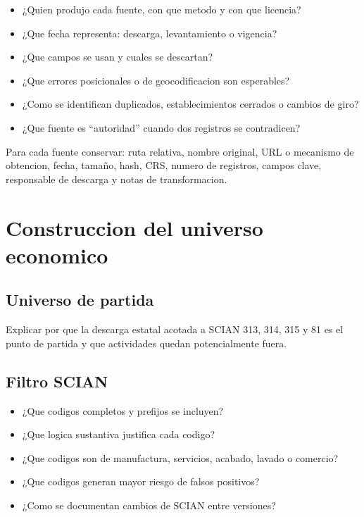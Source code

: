 \documentclass[11pt,letterpaper]{article}
\begin{document}
\begin{preguntas}
\begin{itemize}
    \item ¿Quien produjo cada fuente, con que metodo y con que licencia?
    \item ¿Que fecha representa: descarga, levantamiento o vigencia?
    \item ¿Que campos se usan y cuales se descartan?
    \item ¿Que errores posicionales o de geocodificacion son esperables?
    \item ¿Como se identifican duplicados, establecimientos cerrados o cambios de giro?
    \item ¿Que fuente es ``autoridad'' cuando dos registros se contradicen?
\end{itemize}
\end{preguntas}

\begin{trazabilidad}
Para cada fuente conservar: ruta relativa, nombre original, URL o mecanismo de obtencion, fecha, tamaño, hash, CRS, numero de registros, campos clave, responsable de descarga y notas de transformacion.
\end{trazabilidad}

\section{Construccion del universo economico}

\subsection{Universo de partida}
Explicar por que la descarga estatal acotada a SCIAN 313, 314, 315 y 81 es el punto de partida y que actividades quedan potencialmente fuera.

\subsection{Filtro SCIAN}
\begin{preguntas}
\begin{itemize}
    \item ¿Que codigos completos y prefijos se incluyen?
    \item ¿Que logica sustantiva justifica cada codigo?
    \item ¿Que codigos son de manufactura, servicios, acabado, lavado o comercio?
    \item ¿Que codigos generan mayor riesgo de falsos positivos?
    \item ¿Como se documentan cambios de SCIAN entre versiones?
\end{itemize}
\end{preguntas}
\end{document}
